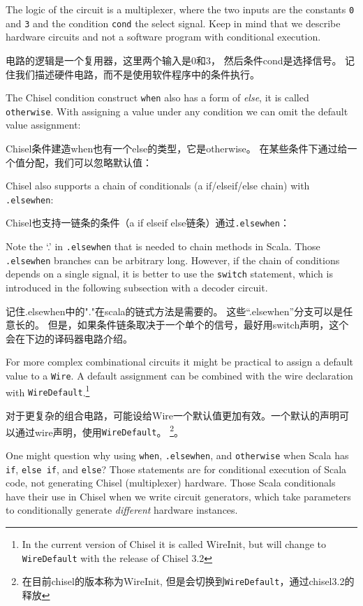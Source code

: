 \documentclass[%
    10pt,
    headinclude, footexclude,
    openright, %
    notitlepage,
    cleardoubleempty,
    headsepline,
    pointlessnumbers,
    bibtotoc, idxtotoc,
    ]{scrbook}
\newcommand{\code}[1]{{\small{\texttt{#1}}}}
\begin{document}
\noindent The logic of the circuit is a multiplexer, where the two inputs are the constants
\code{0} and \code{3} and the condition \code{cond} the select signal.
Keep in mind that we describe hardware circuits and not a software program with conditional
execution.

电路的逻辑是一个复用器，这里两个输入是0和3， 然后条件cond是选择信号。
记住我们描述硬件电路，而不是使用软件程序中的条件执行。

The Chisel condition construct \code{when} also has a form of \emph{else}, it is called
\code{otherwise}. With assigning a value under any condition we can omit the default
value assignment:

Chisel条件建造when也有一个else的类型，它是otherwise。
在某些条件下通过给一个值分配，我们可以忽略默认值：


Chisel also supports a chain of conditionals (a if/elseif/else chain) with \code{.elsewhen}:

Chisel也支持一链条的条件（a if elseif else链条）通过\code{.elsewhen}：


Note the `.' in \code{.elsewhen} that is needed to chain methods in Scala.
Those \code{.elsewhen} branches can be arbitrary long.
However, if the chain of conditions depends on a single signal, it is better
to use the \code{switch} statement, which is introduced in the following
subsection with a decoder circuit.

记住.elsewhen中的"."在scala的链式方法是需要的。
这些“.elsewhen”分支可以是任意长的。
但是，如果条件链条取决于一个单个的信号，最好用switch声明，这个会在下边的译码器电路介绍。

For more complex combinational circuits it might be practical to assign
a default value to a \code{Wire}. A default assignment can be combined with the wire
declaration with \code{WireDefault}.\footnote{In the current version of Chisel
it is called WireInit, but will change to \code{WireDefault} with the release of Chisel 3.2}

对于更复杂的组合电路，可能设给Wire一个默认值更加有效。一个默认的声明可以通过wire声明，使用\code{WireDefault}。
\footnote{在目前chisel的版本称为WireInit, 但是会切换到\code{WireDefault}，通过chisel3.2的释放}。


One might question why using \code{when}, \code{.elsewhen}, and \code{otherwise}
when Scala has \code{if}, \code{else if}, and \code{else}? Those statements are for
conditional execution of Scala code, not generating Chisel (multiplexer) hardware.
Those Scala conditionals have their use in Chisel when we write circuit generators,
which take parameters to conditionally generate \emph{different} hardware instances.
\end{document}
